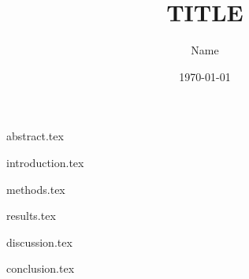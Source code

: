 \documentclass{article}
\begin{document}
\title{TITLE}
\author{Name}
\date{\today}
\maketitle

{abstract.tex}

{introduction.tex}

{methods.tex}

{results.tex}

{discussion.tex}

{conclusion.tex}

\pagebreak
\printbibliography{}
\end{document}
